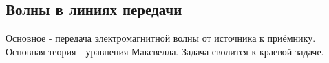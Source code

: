 \subsection{Волны в линиях передачи}
Основное - передача электромагнитной волны от источника к приёмнику.
Основная теория - уравнения Максвелла. Задача сволится к краевой задаче.